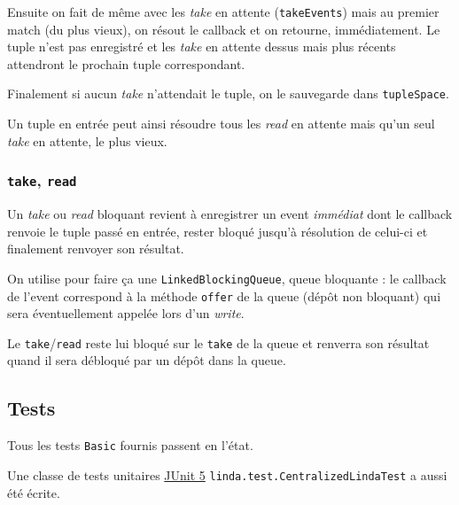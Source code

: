 \documentclass[headings=standardclasses,parskip=half]{scrartcl}
\begin{document}
Ensuite on fait de même avec les \emph{take} en attente (\texttt{takeEvents})
mais au premier match (du plus vieux), on résout le callback et on retourne,
immédiatement. Le tuple n'est pas enregistré et les \emph{take} en attente
dessus mais plus récents attendront le prochain tuple correspondant.

Finalement si aucun \emph{take} n'attendait le tuple, on le sauvegarde dans
\texttt{tupleSpace}.

Un tuple en entrée peut ainsi résoudre tous les \emph{read} en attente mais
qu'un seul \emph{take} en attente, le plus vieux.

\subsubsection{\texttt{take}, \texttt{read}}

Un \emph{take} ou \emph{read} bloquant revient à enregistrer un event
\emph{immédiat} dont le callback renvoie le tuple passé en entrée,
rester bloqué jusqu'à résolution de celui-ci et finalement renvoyer
son résultat.

On utilise pour faire ça une \texttt{LinkedBlockingQueue}, queue bloquante :
le callback de l'event correspond à la méthode \texttt{offer} de la queue
(dépôt non bloquant) qui sera éventuellement appelée lors d'un \emph{write}.

Le \texttt{take}/\texttt{read} reste lui bloqué sur le \texttt{take} de la
queue et renverra son résultat quand il sera débloqué par un dépôt dans
la queue.

\subsection{Tests}

Tous les tests \texttt{Basic} fournis passent en l'état.

Une classe de tests unitaires \href{https://junit.org/junit5/}{JUnit 5}
\texttt{linda.test.CentralizedLindaTest} a aussi été écrite.
\end{document}
